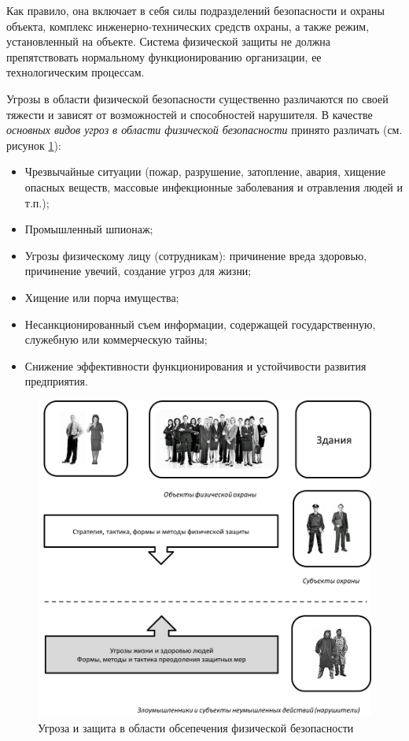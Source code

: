 \documentclass[a4paper,12pt,fleqn]{article} %
\begin{document}
Как правило, она включает в себя силы подразделений безопасности и охраны объекта, комплекс инженерно-технических средств охраны, а также режим, установленный на объекте. Система физической защиты не должна препятствовать нормальному функционированию организации, ее технологическим процессам.

Угрозы в области физической безопасности существенно различаются по своей тяжести и зависят от возможностей и способностей нарушителя. В качестве \textit{основных видов угроз в области физической безопасности} принято различать  (см. рисунок \ref{image1}): 

\begin{itemize}
	\item Чрезвычайные ситуации (пожар, разрушение, затопление, авария, хищение опасных веществ, массовые инфекционные заболевания и отравления людей и т.п.);
	\item Промышленный шпионаж;
	\item Угрозы физическому лицу (сотрудникам): причинение вреда здоровью, причинение увечий, создание угроз для жизни;
	\item Хищение или порча имущества;
	\item Несанкционированный съем информации, содержащей государственную, служебную или коммерческую тайны;
	\item Снижение эффективности функционирования и устойчивости развития предприятия.
\end{itemize}

\begin{figure}
	\centering
	\includegraphics[scale=0.7]{img1}
	\caption{Угроза и защита в области обсепечения физической безопасности}
	\label{image1}
\end{figure}
\end{document}
